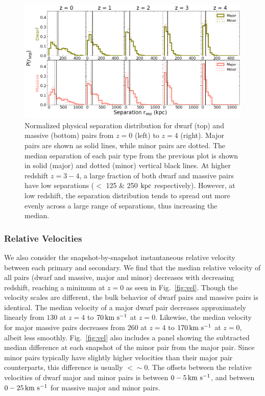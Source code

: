 \documentclass[twocolumn]{aastex631}
\begin{document}
\begin{figure}[htp]
  \centering
  \includegraphics[width=\textwidth]{sepdist_1000.png}
  \caption{Normalized physical separation distribution for dwarf (top) and massive (bottom) pairs from $z=0$ (left) to $z=4$ (right). Major pairs are shown as solid lines, while minor pairs are dotted. The median separation of each pair type from the previous plot is shown in solid (major) and dotted (minor) vertical black lines. 
  At higher redshift $z=3-4$, a large fraction of both dwarf and massive pairs have low separations ($<$ 125 \& 250 $\mathrm{kpc}$ respectively). However, at low redshift, the separation distribution tends to spread out more evenly across a large range of separations, thus increasing the median.
    }
  \label{fig:sep-dist}
\end{figure}


\subsubsection{Relative Velocities}
We also consider the snapshot-by-snapshot instantaneous relative velocity between each primary and secondary.
We find that the median relative velocity of all pairs (dwarf and massive, major and minor) decreases with decreasing redshift, reaching a minimum at $z=0$ as seen in Fig.~\ref{fig:vel}. 
Though the velocity scales are different, the bulk behavior of dwarf pairs and massive pairs is identical. 
\linebreak
The median velocity of a major dwarf pair decreases approximately linearly from $130$ at $z=4$ to $70\,\mathrm{km}~\mathrm{s}^{-1}$ at $z=0$. Likewise, the median velocity for major massive pairs decreases from $260$ at $z=4$ to $170\,\mathrm{km}~\mathrm{s}^{-1}$ at $z=0$, albeit less smoothly. 
Fig.~\ref{fig:vel} also includes a panel showing the subtracted median difference at each snapshot of the minor pair from the major pair. Since minor pairs typically have slightly higher velocities than their major pair counterparts, this difference is usually $<\sim0$. The offsets between the relative velocities of dwarf major and minor pairs is between $0-5\,\mathrm{km}~\mathrm{s}^{-1}$, and between $0-25\,\mathrm{km}~\mathrm{s}^{-1}$ for massive major and minor pairs.
\end{document}
